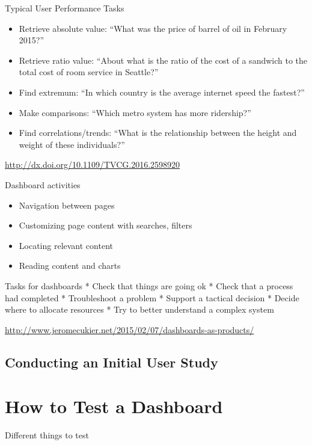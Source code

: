 \documentclass[
]{krantz}
\providecommand{\tightlist}{%
  \setlength{\itemsep}{0pt}\setlength{\parskip}{0pt}}
\begin{document}
Typical User Performance Tasks

\begin{itemize}
\item
  Retrieve absolute value: ``What was the price of barrel of oil in February 2015?''
\item
  Retrieve ratio value: ``About what is the ratio of the cost of a sandwich to the
  total cost of room service in Seattle?''
\item
  Find extremum: ``In which country is the average internet speed the fastest?''
\item
  Make comparisons: ``Which metro system has more ridership?''
\item
  Find correlations/trends: ``What is the relationship between the height
  and weight of these individuals?''
\end{itemize}

\url{http://dx.doi.org/10.1109/TVCG.2016.2598920}

Dashboard activities

\begin{itemize}
\tightlist
\item
  Navigation between pages
\item
  Customizing page content with searches, filters
\item
  Locating relevant content
\item
  Reading content and charts
\end{itemize}

Tasks for dashboards
* Check that things are going ok
* Check that a process had completed
* Troubleshoot a problem
* Support a tactical decision
* Decide where to allocate resources
* Try to better understand a complex system

\url{http://www.jeromecukier.net/2015/02/07/dashboards-as-products/}

\hypertarget{conducting-an-initial-user-study}{%
\subsection{Conducting an Initial User Study}\label{conducting-an-initial-user-study}}

\hypertarget{how-to-test-a-dashboard}{%
\section{How to Test a Dashboard}\label{how-to-test-a-dashboard}}

Different things to test
\end{document}
